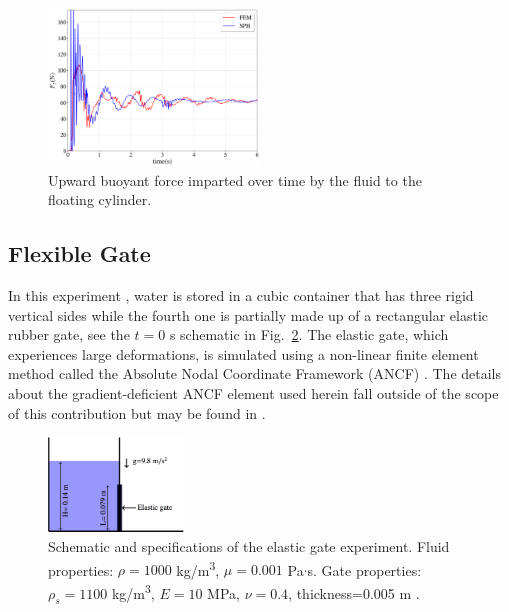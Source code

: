 \documentclass[final,3p,times]{elsarticle}
\begin{document}
\begin{figure}[H]
	\begin{center}
		\includegraphics[width=0.5\textwidth]{Images/Figure_Cylinder_FSI.png}
	\end{center}
	\caption{Upward buoyant force imparted  over time by the fluid to the floating cylinder.}
	\label{fig:CD_F}
\end{figure}

\subsection{Flexible Gate}
In this experiment \cite{Antoci2007,yang2012}, water is stored in a cubic container that has three rigid vertical sides while the fourth one is partially made up of a rectangular elastic rubber gate, see the $t=0$ \si{s} schematic in Fig.~\ref{fig:Elastic_Gate_Schematic}. The elastic gate, which experiences large deformations, is simulated using a non-linear finite element method called the Absolute Nodal Coordinate Framework (ANCF) \cite{shabana2013}. The details about the gradient-deficient ANCF element used herein fall outside of the scope of this contribution but may be found in \cite{yamashita2015continuum}. 
\begin{figure}[H]
	\begin{center}
		\includegraphics[width=0.32\textwidth]{Images/Elastic_Gate_Schematic.png}
	\end{center}
	\caption{Schematic and specifications of the elastic gate experiment. Fluid properties: $\rho=1000$ \si{kg/m^3}, $\mu=0.001$ \si{Pa}$\cdot$\si{s}. Gate properties: $\rho_s=1100$ \si{kg/m^3}, $E=10$ \si{MPa}, $\nu=0.4$, thickness=0.005 \si{m} \cite{Antoci2007}. }
	\label{fig:Elastic_Gate_Schematic}
\end{figure}
\end{document}
